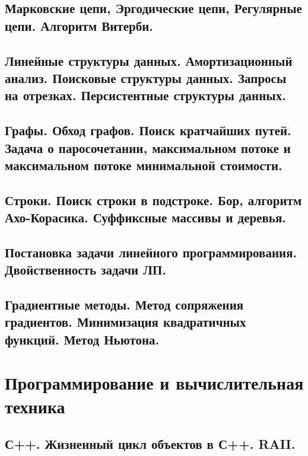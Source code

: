 \documentclass{article}
\begin{document}
\subsection{Марковские цепи, Эргодические цепи, Регулярные цепи. Алгоритм Витерби.}

\subsection{Линейные структуры данных. Амортизационный анализ. Поисковые структуры данных. Запросы на отрезках. Персистентные структуры данных.}

\subsection{Графы. Обход графов. Поиск кратчайших путей. Задача о паросочетании, максимальном потоке и максимальном потоке минимальной стоимости.}

\subsection{Строки. Поиск строки в подстроке. Бор, алгоритм Ахо-Корасика. Суффиксные массивы и деревья.}

\subsection{Постановка задачи линейного программирования. Двойственность задачи ЛП.}

\subsection{Градиентные методы. Метод сопряжения градиентов. Минимизация квадратичных функций. Метод Ньютона.}

\newpage

\section{Программирование и вычислительная техника}







\subsection{С++. Жизненный цикл объектов в С++. RAII.}
\end{document}

